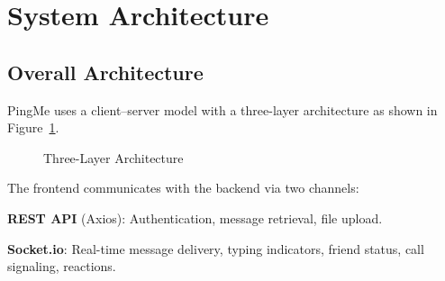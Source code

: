 \documentclass[12pt,a4paper]{article}
\newcommand{\pingme}{PingMe\xspace}
\newcommand{\figref}[1]{Figure~\ref{#1}}
\begin{document}
\section{System Architecture}
\label{sec:architecture}

\subsection{Overall Architecture}

\pingme{} uses a client--server model with a three-layer architecture as shown in
\figref{fig:architecture}.

\begin{figure}[H]
    \centering
    \caption{Three-Layer Architecture}
    \label{fig:architecture}
\end{figure}

The frontend communicates with the backend via two channels:
\begin{compactitem}
    \item \textbf{REST API} (Axios): Authentication, message retrieval, file upload.
    \item \textbf{Socket.io}: Real-time message delivery, typing indicators,
          friend status, call signaling, reactions.
\end{compactitem}
\end{document}
